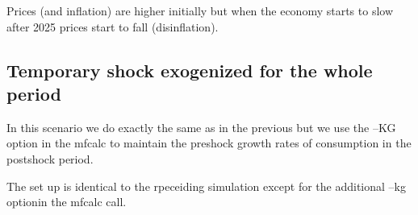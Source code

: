 \documentclass[letterpaper,10pt,english]{jupyterBook}
\begin{document}
\sphinxAtStartPar
Prices (and inflation) are higher initially but when the economy starts to slow after 2025 prices start to fall (disinflation).


\subsection{Temporary shock exogenized for the whole period}
\label{\detokenize{content/06_WBModels/LoadingWBModel:id1}}
\sphinxAtStartPar
In this scenario we do exactly the same as in the previous but we use the –KG option in the mfcalc to maintain the pre\sphinxhyphen{}shock growth rates of consumption in the post\sphinxhyphen{}shock period.

\sphinxAtStartPar
The set up is identical to the rpeceiding simulation except for the additional –kg optionin the mfcalc call.
\end{document}
